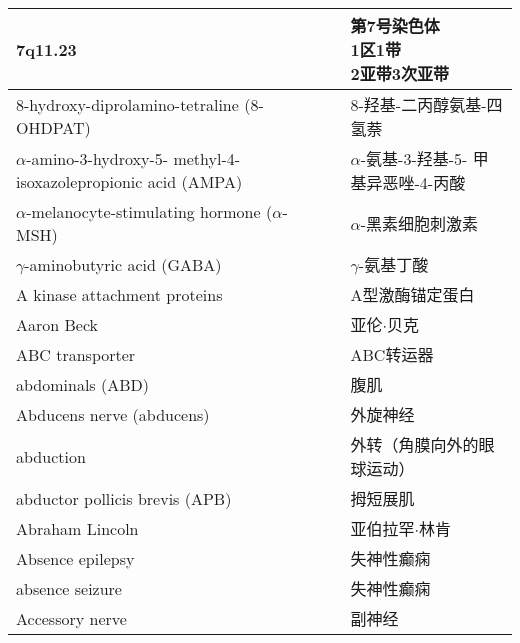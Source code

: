 \begin{longtable}{lll}
 	\midrule
 	7q11.23    && \makecell[l]{第7号染色体\\1区1带\\2亚带3次亚带}   \\
 	
 	\midrule
 	8-hydroxy-diprolamino-tetraline (8-OHDPAT)    && 8-羟基-二丙醇氨基-四氢萘   \\
 	
 	\midrule
 	\makecell[l]{$\alpha$-amino-3-hydroxy-5-\\methyl-4-isoxazolepropionic acid (AMPA)}   && \makecell[l]{$\alpha$-氨基-3-羟基-5-\\甲基异恶唑-4-丙酸}   \\
 	
 	\midrule
 	$\alpha$-melanocyte-stimulating hormone ($\alpha$-MSH)    && $\alpha$-黑素细胞刺激素   \\
 	
 	\midrule
 	$\gamma$-aminobutyric acid (GABA)    && $\gamma$-氨基丁酸   \\
 	
 	\midrule
 	A kinase attachment proteins     && A型激酶锚定蛋白   \\
 	
 	\midrule
 	Aaron Beck     && 亚伦$\cdot$贝克   \\
 	
 	\midrule
 	ABC transporter     && ABC转运器   \\
 	
 	\midrule
 	abdominals (ABD)     && 腹肌   \\
 
 	\midrule
 	Abducens nerve (abducens)     && 外旋神经   \\
 
 	\midrule
 	abduction     && 外转（角膜向外的眼球运动）   \\
 	
 	\midrule
 	abductor pollicis brevis (APB)     && 拇短展肌   \\
 	
 	\midrule
 	Abraham Lincoln     && 亚伯拉罕$\cdot$林肯   \\
 	
 	\midrule
 	Absence epilepsy     && 失神性癫痫   \\
 	
 	\midrule
 	absence seizure     && 失神性癫痫   \\
 	
 	\midrule
 	Accessory nerve   &&  副神经   \\
 	

\end{longtable}
